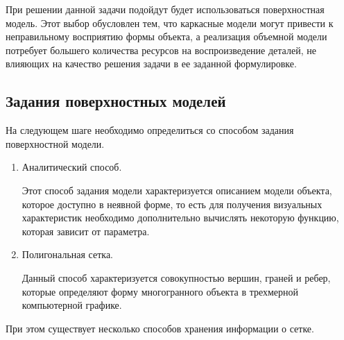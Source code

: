 При решении данной задачи подойдут будет использоваться поверхностная модель. Этот выбор обусловлен тем, что каркасные модели могут привести к неправильному восприятию формы объекта, а реализация объемной модели потребует большего количества ресурсов на воспроизведение деталей, не влияющих на качество решения задачи в ее заданной формулировке.



\subsection{Задания поверхностных моделей}
На следующем шаге необходимо определиться со способом задания поверхностной модели.

\begin{enumerate} 
\item Аналитический способ.

 Этот способ задания модели характеризуется описанием модели объекта, которое доступно в неявной форме, то есть для получения визуальных характеристик необходимо дополнительно вычислять некоторую функцию, которая зависит от параметра.

\item Полигональная сетка.

 Данный способ характеризуется совокупностью вершин, граней и ребер, которые определяют форму многогранного объекта в трехмерной компьютерной графике.

\end{enumerate}


При этом существует несколько способов хранения информации о сетке.

